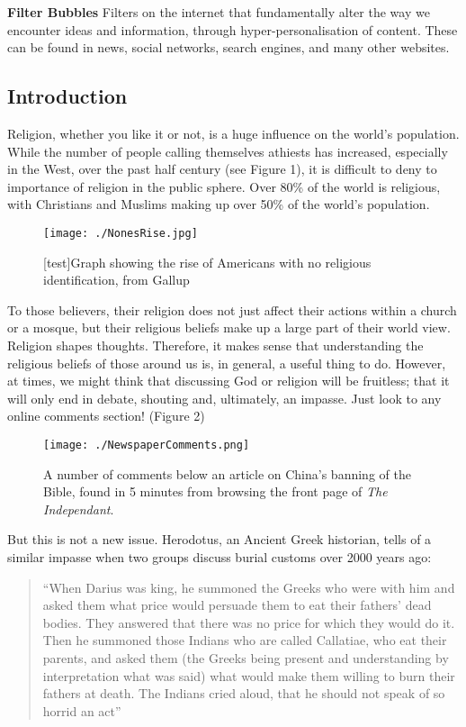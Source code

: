 \documentclass[]{article}
\begin{document}
\textbf{Filter Bubbles } Filters on the internet that fundamentally
alter the way we encounter ideas and information, through
hyper-personalisation of content. These can be found in news, social
networks, search engines, and many other websites.

\hypertarget{introduction}{%
\subsection{Introduction}\label{introduction}}

Religion, whether you like it or not, is a huge influence on the world's
population. While the number of people calling themselves athiests has
increased, especially in the West, over the past half century (see
Figure 1), it is difficult to deny to importance of religion in the
public sphere. Over 80\% of the world is religious, with Christians and
Muslims making up over 50\% of the world's
population\autocite{HackettChristiansremainworld2017}.

\begin{figure}
\centering
\texttt{[image: ./NonesRise.jpg]}
\caption{[test]Graph showing the rise of Americans with no religious
identification, from Gallup\autocite{GallupThisEasterSmaller}}
\end{figure}

To those believers, their religion does not just affect their actions
within a church or a mosque, but their religious beliefs make up a large
part of their world view. Religion shapes thoughts. Therefore, it makes
sense that understanding the religious beliefs of those around us is, in
general, a useful thing to do. However, at times, we might think that
discussing God or religion will be fruitless; that it will only end in
debate, shouting and, ultimately, an impasse. Just look to any online
comments section! (Figure 2)

\begin{figure}
\centering
\texttt{[image: ./NewspaperComments.png]}
\caption{A number of comments below an article on China's banning of the
Bible, found in 5 minutes from browsing the front page of \emph{The
Independant}.\autocite{OppenheimChinacrackssales2018}}
\end{figure}

But this is not a new issue. Herodotus, an Ancient Greek historian,
tells of a similar impasse when two groups discuss burial customs over
2000 years ago:

\begin{quote}
``When Darius was king, he summoned the Greeks who were with him and
asked them what price would persuade them to eat their fathers' dead
bodies. They answered that there was no price for which they would do
it. Then he summoned those Indians who are called Callatiae, who eat
their parents, and asked them (the Greeks being present and
understanding by interpretation what was said) what would make them
willing to burn their fathers at death. The Indians cried aloud, that he
should not speak of so horrid an
act''\autocite{HerodotusHistoryHerodotus1910}
\end{quote}
\end{document}

